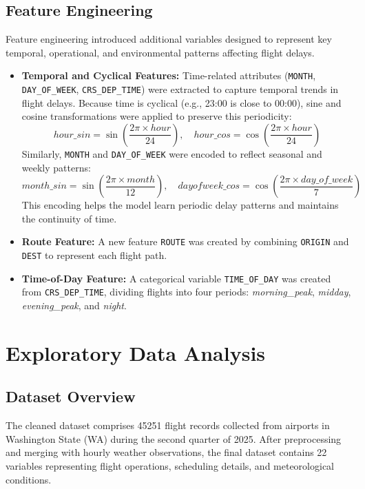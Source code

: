 \documentclass[a4paper,12pt]{report}
\begin{document}
\section{Feature Engineering}
Feature engineering introduced additional variables designed to represent key temporal, operational, and environmental patterns affecting flight delays.

\begin{itemize}
\item \textbf{Temporal and Cyclical Features:} 
Time-related attributes (\texttt{MONTH}, \texttt{DAY\_OF\_WEEK}, \texttt{CRS\_DEP\_TIME}) were extracted to capture temporal trends in flight delays. 
Because time is cyclical (e.g., 23:00 is close to 00:00), sine and cosine transformations were applied to preserve this periodicity:
\[
hour\_sin = \sin\left(\frac{2\pi \times hour}{24}\right), \quad
hour\_cos = \cos\left(\frac{2\pi \times hour}{24}\right)
\]
Similarly, \texttt{MONTH} and \texttt{DAY\_OF\_WEEK} were encoded to reflect seasonal and weekly patterns:
\[
month\_sin = \sin\left(\frac{2\pi \times month}{12}\right), \quad
dayofweek\_cos = \cos\left(\frac{2\pi \times day\_of\_week}{7}\right)
\]
This encoding helps the model learn periodic delay patterns and maintains the continuity of time.
\item \textbf{Route Feature:} 
A new feature \texttt{ROUTE} was created by combining \texttt{ORIGIN} and \texttt{DEST} to represent each flight path. 
\item \textbf{Time-of-Day Feature:} 
A categorical variable \texttt{TIME\_OF\_DAY} was created from \texttt{CRS\_DEP\_TIME}, dividing flights into four periods: \textit{morning\_peak}, \textit{midday}, \textit{evening\_peak}, and \textit{night}. 

\end{itemize}


\chapter{Exploratory Data Analysis}
\section{Dataset Overview}

The cleaned dataset comprises 45251 flight records collected from airports in Washington State (WA) during the second quarter of 2025. 
After preprocessing and merging with hourly weather observations, the final dataset contains 22 variables representing flight operations, scheduling details, and meteorological conditions.
\end{document}
